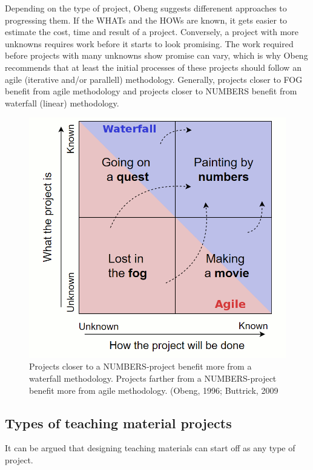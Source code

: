 Depending on the type of project, Obeng suggests differenent approaches to progressing them. If the WHATs and the HOWs are known, it gets easier to estimate the cost, time and result of a project. Conversely, a project with more unknowns requires work before it starts to look promising. The work required before projects with many unknowns show promise can vary, which is why Obeng recommends that at least the initial processes of these projects should follow an agile (iterative and/or parallell) methodology. Generally, projects closer to FOG benefit from agile methodology and projects closer to NUMBERS benefit from waterfall (linear) methodology.

\begin{figure}[H]
\hspace*{-1cm}
\centering
\includegraphics[scale=0.35]{figure/obeng3.png}
\caption{Projects closer to a NUMBERS-project benefit more from a waterfall methodology. Projects farther from a NUMBERS-project benefit more from agile methodology. (Obeng, 1996; Buttrick, 2009}
\label{obeng3}
\end{figure}


\subsection{Types of teaching material projects}
It can be argued that designing teaching materials can start off as any type of project. 


